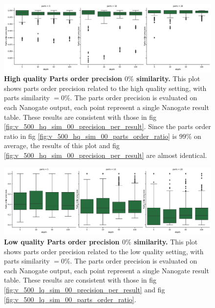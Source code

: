 \documentclass[11pt, a4paper]{article}
\begin{document}
\begin{figure}[ht]
    \begin{center}
    \includegraphics[width=1.35\textwidth]{../results/images_notebook/v_500/hq_sim_00_parts_order_precision.pdf}
    \end{center}
    \caption{{\bf High quality Parts order precision $0\%$ similarity.} This plot shows parts order precision related to the high quality setting, with parts similarity $=0\%$. The parts order precision is evaluated on each  Nanogate output, each point represent a single Nanogate result table. These results are consistent with those in fig \ref{fig:v_500_hq_sim_00_precision_per_result}. Since the parts order ratio in fig \ref{fig:v_500_hq_sim_00_parts_order_ratio} is $99\%$ on average, the results of this plot and  fig \ref{fig:v_500_hq_sim_00_precision_per_result} are almost identical.}
   \label{fig:v_500_hq_sim_00_parts_order_precision}
\end{figure}

\begin{figure}[ht]
    \begin{center}
    \includegraphics[width=1.35\textwidth]{../results/images_notebook/v_500/lq_sim_00_parts_order_precision.pdf}
    \end{center}
    \caption{{\bf Low quality Parts order precision $0\%$ similarity.} This plot shows parts order precision related to the low quality setting, with parts similarity $=0\%$. The parts order precision is evaluated on each  Nanogate output, each point represent a single Nanogate result table. These results are consistent with those in fig \ref{fig:v_500_lq_sim_00_precision_per_result} and fig \ref{fig:v_500_lq_sim_00_parts_order_ratio}.}
   \label{fig:v_500_lq_sim_00_parts_order_precision}
\end{figure}
\end{document}

